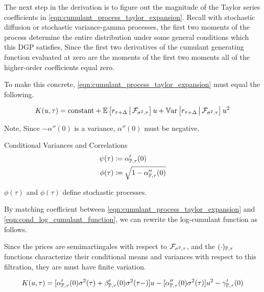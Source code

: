 \documentclass[11pt, letterpaper, twoside, final]{article}
\begin{document}
The next step in the derivation is to figure out the magnitude of the Taylor series coefficients in
\cref{eqn:cumulant_process_taylor_expansion}.
Recall with stochastic diffusion or stochastic variance-gamma processes, the first two moments of the
process determine the entire distribution under some general conditions which this DGP satisfies,
\parencite{sangrey2018jumps}
Since the first two derivatives of the cumulant generating function evaluated at zero are the moments of the first
two moments all of the higher-order coefficients  equal zero.

To make this concrete, \cref{eqn:cumulant_process_taylor_expansion} must equal the following. 


\begin{equation}
    \label{eqn:cond_log_cumulant_function}
    K(u, \tau) = \text{constant} + \operatorname{\mathbb{E}}\left[r_{\tau + \Delta} \,\middle\vert\, \mathcal{F}_{\sigma^2, \tau}\right]  u  +
    \operatorname{\mathbb{V}ar}\left[r_{\tau + \Delta} \,\middle\vert\, \mathcal{F}_{\sigma^2, \tau}\right]  u^2 
\end{equation}

Note, Since $-\alpha''(0)$ is a variance, $\alpha''(0)$ must be negative.

\begin{defn}{Conditional Variances and Correlations} 
    \begin{align}
        \psi(\tau) &\coloneqq \alpha_{\mathbb{P}, \tau}'(0) \\
        \phi(\tau) &\coloneqq \sqrt{1 -\alpha_{\mathbb{P}, \tau}''(0)}
    \end{align}
\end{defn}

$\phi(\tau)$ and $\phi(\tau)$ define stochastic processes.

By matching coefficient between \cref{eqn:cumulant_process_taylor_expansion} and
\cref{eqn:cond_log_cumulant_function}, we can rewrite the log-cumulant function as follows.

Since the prices are semimartingales with respect to $\mathcal{F}_{\sigma^2, \tau}$, and the $(\cdot)_{\mathbb{P},\tau}$ functions
characterize their conditional means and variances with respect to this filtration, they are must have finite
variation. 



\begin{equation}
    K(u, \tau) = [\alpha_{\mathbb{P}, \tau}'(0)\sigma^2(\tau)  + \beta_{\mathbb{P}, \tau}'(0)\sigma^2(\tau-)] u - [\alpha_{\mathbb{P},
    \tau}''(0) \sigma^2(\tau)] u^2  - \gamma_{\mathbb{P}, \tau}'(0) 
\end{equation}
\end{document}
